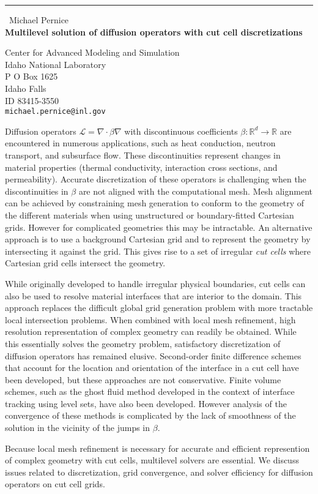 \documentclass{report}
\begin{document}
\begin{center}
\rule{6in}{1pt} \
{\large Michael Pernice \\
{\bf Multilevel solution of diffusion operators with cut cell discretizations}}

Center for Advanced Modeling and Simulation \\ Idaho National Laboratory \\ P O Box 1625 \\ Idaho Falls \\ ID 83415-3550
\\
{\tt michael.pernice@inl.gov}\end{center}

Diffusion operators $\mathcal{L} = \nabla \cdot \beta \nabla$ with
discontinuous coefficients $\beta : \mathbb{R}^d \rightarrow
\mathbb{R}$ are encountered in numerous applications, such as heat
conduction, neutron transport, and subsurface flow. These
discontinuities represent changes in material properties (thermal
conductivity, interaction cross sections, and permeability). Accurate
discretization of these operators is challenging when the
discontinuities in $\beta$ are not aligned with the computational
mesh. Mesh alignment can be achieved by constraining mesh generation to
conform to the geometry of the different materials when using
unstructured or boundary-fitted Cartesian grids. However for complicated
geometries this may be intractable. An alternative approach is to use a
background Cartesian grid and to represent the geometry by intersecting
it against the grid. This gives rise to a set of irregular \textit{cut
cells} where Cartesian grid cells intersect the geometry.

While originally developed to handle irregular physical boundaries,
cut cells can also be used to resolve material interfaces that are
interior to the domain. This approach replaces the difficult global grid
generation problem with more tractable local intersection problems. When
combined with local mesh refinement, high resolution representation of
complex geometry can readily be obtained. While this essentially solves
the geometry problem, satisfactory discretization of diffusion operators
has remained elusive. Second-order finite difference schemes that account
for the location and orientation of the interface in a cut cell have been
developed, but these approaches are not conservative. Finite volume
schemes, such as the ghost fluid method developed in the context of
interface tracking using level sets, have also been developed. However
analysis of the convergence of these methods is complicated by the lack
of smoothness of the solution in the vicinity of the jumps in $\beta$.

Because local mesh refinement is necessary for accurate and efficient
represention of complex geometry with cut cells, multilevel solvers are
essential. We discuss issues related to discretization, grid convergence,
and solver efficiency for diffusion operators on cut cell grids.
\end{document}
